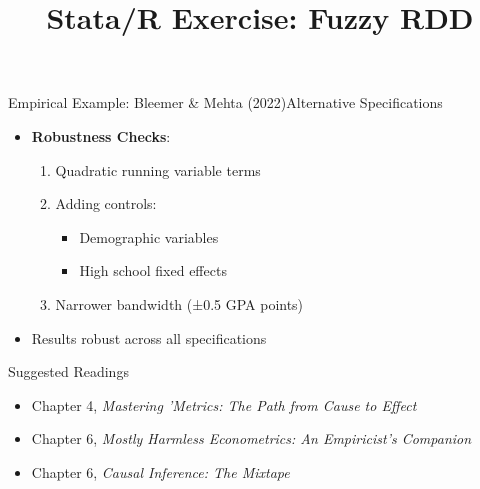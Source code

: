 \documentclass[hyperref={pdfpagelabels=false}]{beamer}
\begin{document}
\begin{frame}{Empirical Example: Bleemer \& Mehta (2022)}{Alternative Specifications}
	\begin{itemize}
	
		\item \textbf{Robustness Checks}:
		\begin{enumerate}
			\item Quadratic running variable terms
			\item Adding controls:
			\begin{itemize}
				\item Demographic variables
				\item High school fixed effects
			\end{itemize}
			\item Narrower bandwidth (±0.5 GPA points)
		\end{enumerate}
		
		\vspace{0.2cm}
		\item Results robust across all specifications
	\end{itemize}
\end{frame}


\begin{frame}{Suggested Readings} %
	\begin{itemize} 
		\item Chapter 4, \textit{Mastering 'Metrics: The Path from Cause to Effect}
		\vspace{0.2cm}
		\item Chapter 6, \textit{Mostly Harmless Econometrics: An Empiricist's Companion} %
		\vspace{0.2cm}
		\item Chapter 6, \textit{Causal Inference: The Mixtape}
	\end{itemize}
\end{frame}

\title[]
{Stata/R Exercise: Fuzzy RDD}

\author
{}

\institute{}

\date
{}

\begin{frame}{}
	\titlepage
\end{frame}
\end{document}
